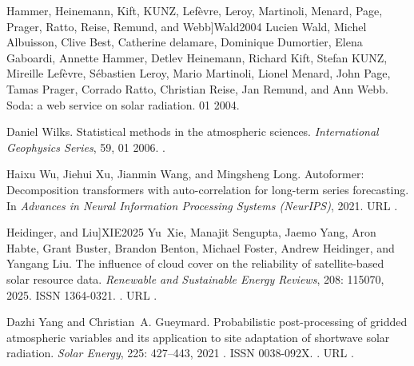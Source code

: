\documentclass[letterpaper,12pt, twoside]{report}
\providecommand{\DIFdeltex}[1]{{\protect\color{red} \scriptsize #1}} %
\providecommand{\DIFdel}[1]{\texorpdfstring{\DIFdeltex{#1}}{}} %
\begin{document}
  Hammer, Heinemann, Kift, KUNZ, Lefèvre, Leroy, Martinoli, Menard, Page,
  Prager, Ratto, Reise, Remund, and Webb]{Wald2004}
\DIFdel{Lucien Wald, Michel Albuisson, Clive Best, Catherine delamare, Dominique
  Dumortier, Elena Gaboardi, Annette Hammer, Detlev Heinemann, Richard Kift,
  Stefan KUNZ, Mireille Lefèvre, Sébastien Leroy, Mario Martinoli, Lionel
  Menard, John Page, Tamas Prager, Corrado Ratto, Christian Reise, Jan Remund,
  and Ann Webb.
}%
\DIFdel{Soda: a web service on solar radiation.
}%
\DIFdel{01 2004.
}%

\DIFdel{Daniel Wilks.
}%
\DIFdel{Statistical methods in the atmospheric sciences.
}%
\DIFdel{\emph{International Geophysics Series}, 59, 01 2006.
}%
\DIFdel{.
}%

\DIFdel{Haixu Wu, Jiehui Xu, Jianmin Wang, and Mingsheng Long.
}%
\DIFdel{Autoformer: Decomposition transformers with auto-correlation for
  long-term series forecasting.
}%
\DIFdel{In \emph{Advances in Neural Information Processing Systems
  (NeurIPS)}, 2021.
}%
\DIFdel{URL }%
\DIFdel{.
}%

  Heidinger, and Liu]{XIE2025}
\DIFdel{Yu~Xie, Manajit Sengupta, Jaemo Yang, Aron Habte, Grant Buster, Brandon Benton,
  Michael Foster, Andrew Heidinger, and Yangang Liu.
}%
\DIFdel{The influence of cloud cover on the reliability of satellite-based
  solar resource data.
}%
\DIFdel{\emph{Renewable and Sustainable Energy Reviews}, 208:}%
\DIFdel{115070, 2025.
}%
\DIFdel{ISSN 1364-0321.
}%
\DIFdel{.
}%
\DIFdel{URL
  }%
\DIFdel{.
}%

\DIFdel{Dazhi Yang and Christian~A. Gueymard.
}%
\DIFdel{Probabilistic post-processing of gridded atmospheric variables and
  its application to site adaptation of shortwave solar radiation.
}%
\DIFdel{\emph{Solar Energy}, 225:}%
\DIFdel{427--443, 2021}%
\DIFdel{.
}%
\DIFdel{ISSN 0038-092X.
}%
\DIFdel{.
}%
\DIFdel{URL
  }%
\DIFdel{.
}%
\end{document}
